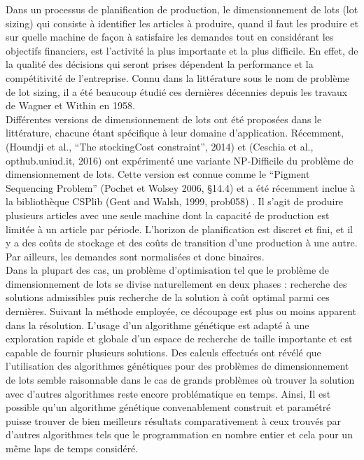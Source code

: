 \documentclass[12pt,a4paper]{article}
\begin{document}
	Dans un processus de planification de production, le dimensionnement
de lots (lot sizing) qui consiste à identifier les articles à produire, quand il
faut les produire et sur quelle machine de façon à satisfaire les demandes
tout en considérant les objectifs financiers, est l’activité la plus importante
et la plus difficile. En effet, de la qualité des décisions qui seront prises
dépendent la performance et la compétitivité de l’entreprise. Connu dans la
littérature sous le nom de problème de lot sizing, il a été beaucoup étudié
ces dernières décennies depuis les travaux de Wagner et Within en 1958. \\
	\hspace*{.5cm} Différentes versions de dimensionnement de lots ont été proposées dans le littérature, chacune étant spécifique à leur domaine d'application. Récemment, (Houndji et al., “The stockingCost constraint”, 2014) et (Ceschia et al., opthub.uniud.it, 2016) ont expérimenté une variante NP-Difficile du problème de dimensionnement de lots. Cette version est connue comme le “Pigment Sequencing Problem” (Pochet et Wolsey 2006, §14.4) et a été récemment inclue à la bibliothèque CSPlib (Gent and Walsh, 1999, prob058) . Il s'agit de produire plusieurs articles avec une seule machine dont la capacité de production est limitée à un article par période. L'horizon de planification est discret et fini, et il y a des coûts de stockage et des coûts de transition d'une production à une autre. Par ailleurs, les demandes sont normalisées et donc binaires. \\
	\hspace*{.5cm} Dans la plupart des cas, un problème d’optimisation tel que le problème de dimensionnement de lots se divise naturellement en deux phases : recherche des solutions admissibles puis recherche de la solution à coût optimal parmi ces dernières. Suivant la méthode employée, ce découpage est plus ou moins apparent dans la résolution. L’usage d’un algorithme génétique est adapté à une exploration rapide et globale d’un espace de recherche de taille importante et est capable de fournir plusieurs solutions. Des calculs effectués ont révélé que l'utilisation des algorithmes génétiques pour des problèmes de dimensionnement de lots semble raisonnable dans le cas de grands problèmes où trouver la solution avec d'autres algorithmes reste encore problématique en temps. Ainsi, Il est possible qu'un algorithme génétique convenablement construit et paramétré puisse trouver de bien meilleurs résultats comparativement à ceux trouvés par d'autres algorithmes tels que le programmation en nombre entier et cela pour un même laps de temps considéré.
	
\end{document}
